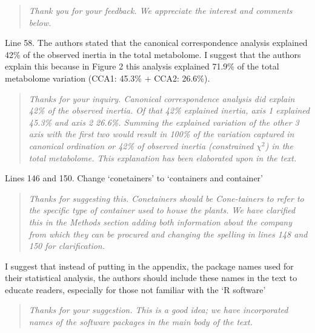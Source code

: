 \documentclass{article}
\begin{document}
\begin{quote}
    \textit{Thank you for your feedback.  We appreciate the interest and comments below.}
\end{quote}

Line 58. The authors stated that the canonical correspondence analysis explained 42\% of the observed inertia in the total metabolome. I suggest that the authors explain this because in Figure 2 this analysis explained 71.9\% of the total metabolome variation (CCA1: 45.3\% + CCA2: 26.6\%).

\begin{quote}
  \textit{Thanks for your inquiry.  Canonical correspondence analysis did explain 42\% of the observed inertia.  Of that 42\% explained inertia, axis 1 explained 45.3\% and axis 2 26.6\%.  Summing the explained variation of the other 3 axis with the first two would result in 100\% of the variation captured in canonical ordination or 42\% of observed inertia (constrained $\chi^2$) in the total metabolome. This explanation has been elaborated upon in the text.   } 
\end{quote}

Lines 146 and 150. Change ‘conetainers’ to ‘containers and container’

\begin{quote}
    \textit{Thanks for suggesting this. Conetainers should be Cone-tainers to refer to the specific type of container used to house the plants.  We have clarified this in the Methods section adding both information about the company from which they can be procured and changing the spelling in lines 148 and 150 for clarification.  }
\end{quote}

I suggest that instead of putting in the appendix, the package names used for their statistical analysis, the authors should include these names in the text to educate readers, especially for those not familiar with the ‘R software’

\begin{quote}
    \textit{Thanks for your suggestion.  This is a good idea; we have incorporated names of the software packages in the main body of the text.}
\end{quote}
\end{document}
